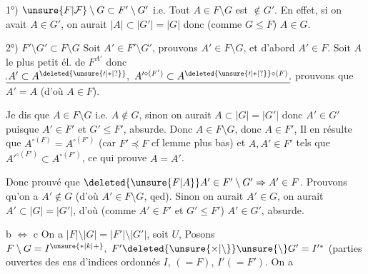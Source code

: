  1°) $\unsure{F|\mathcal F}\setminus G\subset F'\setminus G'$ i.e. Tout $A\in F\setminus G$ est $\notin G'$. En effet, si on avait $A\in G'$, on aurait $|A|\subset|G'|=|G|$ donc  (comme $G\leq F$) $A\in G$.


2°) $F'\setminus G'\subset F\setminus G$ Soit $A'\in F'\setminus G'$, prouvons $A'\in F\setminus G$, et d'abord $A'\in F$.  Soit $A$ le plus petit él. de $F^{A'}$ donc $\underline{\rule[-.15ex]{.35pt}{.55ex}\,A'\subset A^{\deleted{\unsure{\prime|\ast|?}}},\ A'^{\circ(F')}\subset A^{\deleted{\unsure{\prime|\ast|?}}\circ(F)}\,\rule[-.15ex]{.35pt}{.55ex}}$ prouvons que $A'=A$ (d'où $A\in F$). 

Je dis que $A\in F\setminus G$ i.e. $A\notin G$, sinon on aurait $A\subset|G|=|G'|$ donc $A'\in G'$ puisque $A'\in F'$ et $G'\leq F'$, absurde.  Donc $A\in F\setminus G$, donc $A\in F'$,  Il en résulte que $A^{\circ(F)}=A^{\circ(F')}$ (car $F'\preceq F$\deleted{)} cf lemme plus bas) et   $A,A'\in F'$ tels que $A'^{\circ(F')}\subset A^{\circ(F')}$, ce qui prouve $A=A'$.

Donc  prouvé que $\deleted{\unsure{F|A}}A'\in F'\setminus G'\Rightarrow A'\in F$. Prouvons qu'on a $A'\notin G$ (d'où $A'\in F\setminus G$\deleted{)}, qed). Sinon on aurait $A'\in G$, on aurait $A'\subset |G|=|G'|$, d'où (comme $A'\in F'$ et $G'\leq F'$) $A'\in G'$, absurde.


b $\Longleftrightarrow$ c  On a $|F|\setminus|G|=|F'|\setminus|G'|$, soit $U$, Posons $F\setminus G=I^{\unsure{\ast|k|+}},\ F'\deleted{\unsure{\times|\setminus}}\unsure{\setminus}G'=I'^{\ast}$ (parties ouvertes des ens d'indices ordonnés $I$,  $(=F)$, $I'(=F')$. On a
